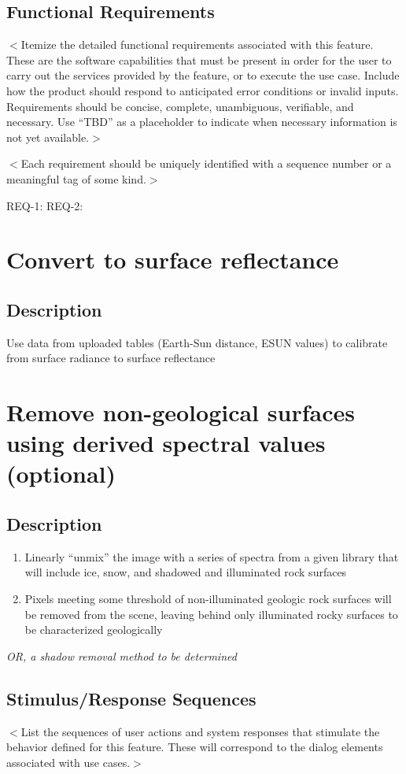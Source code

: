 \documentclass{scrreprt}
\begin{document}
\subsection{Functional Requirements}
$<$Itemize the detailed functional requirements associated with this feature.  
These are the software capabilities that must be present in order for the user 
to carry out the services provided by the feature, or to execute the use case.  
Include how the product should respond to anticipated error conditions or 
invalid inputs. Requirements should be concise, complete, unambiguous, 
verifiable, and necessary. Use “TBD” as a placeholder to indicate when necessary 
information is not yet available.$>$

$<$Each requirement should be uniquely identified with a sequence number or a 
meaningful tag of some kind.$>$

REQ-1:  REQ-2:


\section{Convert to surface reflectance}
\subsection{Description}
Use data from uploaded tables (Earth-Sun distance, ESUN values) to calibrate from surface 
radiance to surface reflectance

\section{Remove non-geological surfaces using derived spectral values (optional)}
\subsection{Description}
\begin{enumerate}
	\item Linearly ``unmix'' the image with a series of spectra from a given library that 
		will include ice, snow, and shadowed and illuminated rock surfaces
	\item Pixels meeting some threshold of non-illuminated geologic rock surfaces will 
		be removed from the scene, leaving behind only illuminated rocky surfaces to be characterized geologically
\end{enumerate}
\textit{OR, a shadow removal method to be determined}

\subsection{Stimulus/Response Sequences}
$<$List the sequences of user actions and system responses that stimulate the 
behavior defined for this feature. These will correspond to the dialog elements 
associated with use cases.$>$
\end{document}
